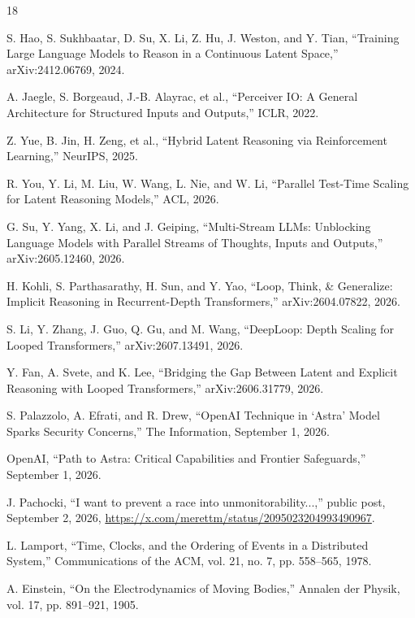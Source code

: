 \documentclass[10pt,twocolumn]{article}
\begin{document}
\begin{thebibliography}{18}
\small

S. Hao, S. Sukhbaatar, D. Su, X. Li, Z. Hu, J. Weston, and Y. Tian,
``Training Large Language Models to Reason in a Continuous Latent Space,''
arXiv:2412.06769, 2024.

A. Jaegle, S. Borgeaud, J.-B. Alayrac, et al.,
``Perceiver IO: A General Architecture for Structured Inputs and Outputs,''
ICLR, 2022.

Z. Yue, B. Jin, H. Zeng, et al.,
``Hybrid Latent Reasoning via Reinforcement Learning,''
NeurIPS, 2025.

R. You, Y. Li, M. Liu, W. Wang, L. Nie, and W. Li,
``Parallel Test-Time Scaling for Latent Reasoning Models,''
ACL, 2026.

G. Su, Y. Yang, X. Li, and J. Geiping,
``Multi-Stream LLMs: Unblocking Language Models with Parallel Streams of Thoughts, Inputs and Outputs,''
arXiv:2605.12460, 2026.

H. Kohli, S. Parthasarathy, H. Sun, and Y. Yao,
``Loop, Think, \& Generalize: Implicit Reasoning in Recurrent-Depth Transformers,''
arXiv:2604.07822, 2026.

S. Li, Y. Zhang, J. Guo, Q. Gu, and M. Wang,
``DeepLoop: Depth Scaling for Looped Transformers,''
arXiv:2607.13491, 2026.

Y. Fan, A. Svete, and K. Lee,
``Bridging the Gap Between Latent and Explicit Reasoning with Looped Transformers,''
arXiv:2606.31779, 2026.

S. Palazzolo, A. Efrati, and R. Drew,
``OpenAI Technique in `Astra' Model Sparks Security Concerns,''
The Information, September 1, 2026.

OpenAI,
``Path to Astra: Critical Capabilities and Frontier Safeguards,''
September 1, 2026.

J. Pachocki,
``I want to prevent a race into unmonitorability...,''
public post, September 2, 2026,
\url{https://x.com/merettm/status/2095023204993490967}.

L. Lamport,
``Time, Clocks, and the Ordering of Events in a Distributed System,''
Communications of the ACM, vol. 21, no. 7, pp. 558--565, 1978.

A. Einstein,
``On the Electrodynamics of Moving Bodies,''
Annalen der Physik, vol. 17, pp. 891--921, 1905.


\end{thebibliography}
\end{document}
